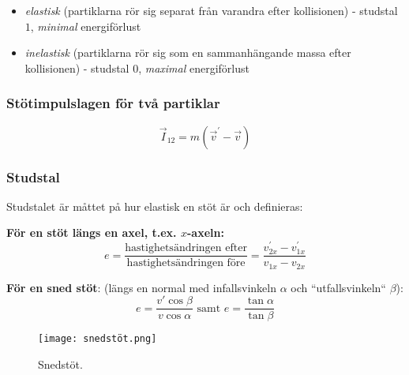 \documentclass{article}
\newenvironment{ankiflashcard}[1]{}{}
\begin{document}
\begin{paracol}{2}
\begin{ankiflashcard}{Förklara de olika typerna av stötar som finns, hur energiförlusten ser ut och vad studstalet är.}
    
\begin{itemize}
    \item \textit{elastisk} (partiklarna rör sig separat från varandra efter kollisionen) - studstal $1$, \color{blue}\textit{minimal }\color{black} energiförlust
    \item  \textit{inelastisk } (partiklarna rör sig som en sammanhängande massa efter kollisionen) - studstal $0$, \color{red}\textit{maximal }\color{black} energiförlust
\end{itemize}
\end{ankiflashcard}

\begin{ankiflashcard}{Formulera stötimpulslagen för två partiklar}
\subsubsection{Stötimpulslagen för två partiklar}
$$\vec I_{12} = m(\vec v^{\prime} - \vec v)$$
\end{ankiflashcard}

\subsubsection{Studstal}
Studstalet är måttet på hur elastisk en stöt är och definieras:


\begin{ankiflashcard}{Ange de olika formlerna för studstal, inklusive snedstöt.}
    
\textbf{För en stöt längs en axel, t.ex. $x$-axeln:}
$$
e=\frac{\text{hastighetsändringen efter}}{\text{hastighetsändringen före}}=\frac{v_{2x}^{\prime}-{v_{1x}^{\prime}}}{v_{1x}-v_{2x}}
$$


\textbf{För en sned stöt}:
(längs en normal med infallsvinkeln $\alpha$ och ``utfallsvinkeln`` $\beta$):
$$
e=\frac{v'\cos\beta}{v\cos\alpha}\text{ samt } e =\frac{\tan \alpha}{\tan \beta}
$$
\begin{figure}[H]
    \centering
\texttt{[image: snedstöt.png]}
    \caption{Snedstöt.}
\end{figure}
\end{ankiflashcard}

\end{paracol}
\end{document}
